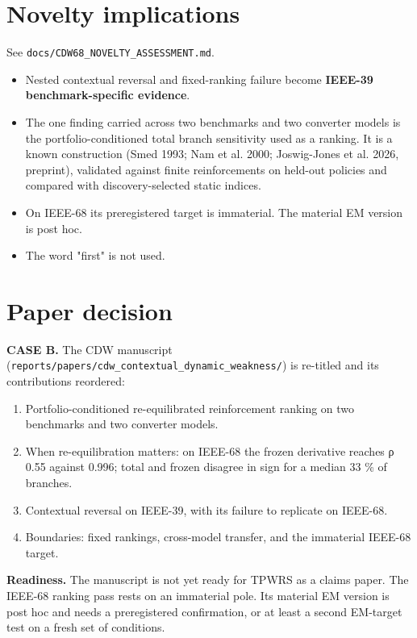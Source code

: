 \documentclass[10pt,a4paper]{article}
\begin{document}
\section{Novelty implications}
See \texttt{docs/\allowbreak{}CDW68\_\allowbreak{}NOVELTY\_\allowbreak{}ASSESSMENT.md}.

\begin{itemize}
\item Nested contextual reversal and fixed-ranking failure become \textbf{IEEE-39 benchmark-specific evidence}.
\item The one finding carried across two benchmarks and two converter models is the portfolio-conditioned total branch sensitivity used as a ranking. It is a known construction (Smed 1993; Nam et al. 2000; Joswig-Jones et al. 2026, preprint), validated against finite reinforcements on held-out policies and compared with discovery-selected static indices.
\item On IEEE-68 its preregistered target is immaterial. The material EM version is post hoc.
\item The word "first" is not used.
\end{itemize}
\section{Paper decision}
\textbf{CASE B.} The CDW manuscript (\texttt{reports/\allowbreak{}papers/\allowbreak{}cdw\_\allowbreak{}contextual\_\allowbreak{}dynamic\_\allowbreak{}weakness/\allowbreak{}}) is re-titled and its contributions reordered:

\begin{enumerate}
\item Portfolio-conditioned re-equilibrated reinforcement ranking on two benchmarks and two converter models.
\item When re-equilibration matters: on IEEE-68 the frozen derivative reaches ρ 0.55 against 0.996; total and frozen disagree in sign for a median 33 \% of branches.
\item Contextual reversal on IEEE-39, with its failure to replicate on IEEE-68.
\item Boundaries: fixed rankings, cross-model transfer, and the immaterial IEEE-68 target.
\end{enumerate}
\textbf{Readiness.} The manuscript is not yet ready for TPWRS as a claims paper. The IEEE-68 ranking pass rests on an immaterial pole. Its material EM version is post hoc and needs a preregistered confirmation, or at least a second EM-target test on a fresh set of conditions.
\end{document}
